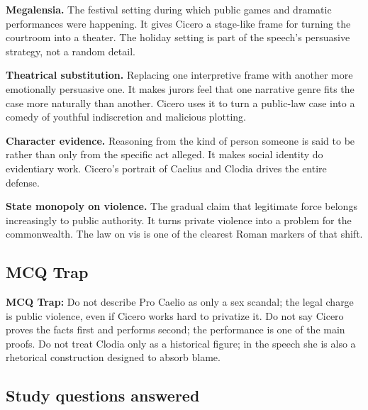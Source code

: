 \documentclass[11pt]{article}
\begin{document}
\textbf{Megalensia.} The festival setting during which public games and dramatic performances were happening. It gives Cicero a stage-like frame for turning the courtroom into a theater. The holiday setting is part of the speech's persuasive strategy, not a random detail.

\textbf{Theatrical substitution.} Replacing one interpretive frame with another more emotionally persuasive one. It makes jurors feel that one narrative genre fits the case more naturally than another. Cicero uses it to turn a public-law case into a comedy of youthful indiscretion and malicious plotting.

\textbf{Character evidence.} Reasoning from the kind of person someone is said to be rather than only from the specific act alleged. It makes social identity do evidentiary work. Cicero's portrait of Caelius and Clodia drives the entire defense.

\textbf{State monopoly on violence.} The gradual claim that legitimate force belongs increasingly to public authority. It turns private violence into a problem for the commonwealth. The law on vis is one of the clearest Roman markers of that shift.

\subsection{MCQ Trap}

\begin{quotebox}
\textbf{MCQ Trap:} Do not describe Pro Caelio as only a sex scandal; the legal charge is public violence, even if Cicero works hard to privatize it. Do not say Cicero proves the facts first and performs second; the performance is one of the main proofs. Do not treat Clodia only as a historical figure; in the speech she is also a rhetorical construction designed to absorb blame.
\end{quotebox}

\subsection{Study questions answered}
\end{document}
